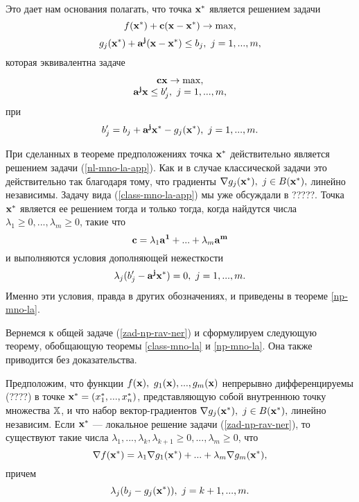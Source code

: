     Это дает нам основания полагать, что точка $\mathbf{x^{*}}$
    является решением задачи
    \[f(\mathbf{x^{*}})+\mathbf{c}(\mathbf{x}-\mathbf{x^{*}})\rightarrow\max,\]
    \[g_{j}(\mathbf{x^{*}})+\mathbf{a^{j}}(\mathbf{x}-\mathbf{x^{*}})\leq b_{j}, \ j=1,...,m,\]
    которая эквивалентна задаче
\begin{equation}
    \label{nl-mno-la-app}
    \begin{array}{c}
        \mathbf{c}\mathbf{x}\rightarrow\max, \\
        \mathbf{a^{j}}\mathbf{x}\leq b_{j}', \ j=1,...,m,
      \end{array}
\end{equation}
        при
    \[b_{j}'=b_{j}+\mathbf{a^{j}}\mathbf{x^{*}}-g_{j}(\mathbf{x^{*}}), \ j=1,...,m.\]

    При сделанных в теореме предположениях точка $\mathbf{x^{*}}$
    действительно является решением задачи (\ref{nl-mno-la-app}).
    Как и в случае классической задачи это действительно так благодаря тому, что градиенты
    $\nabla g_{j}(\mathbf{x^{*}}), \ j\in B(\mathbf{x^{*}}),$
    линейно независимы. Задачу вида (\ref{class-mno-la-app}) мы
    уже обсуждали в ?????. Точка $\mathbf{x^{*}}$ является ее решением  тогда и только
    тогда, когда найдутся числа $\lambda_{1}\geq0,...,\lambda_{m}\geq0$, такие
    что
    \[\mathbf{c}=\lambda_{1}\mathbf{a^{1}}+...+\lambda_{m}\mathbf{a^{m}}\]
    и выполняются условия дополняющей нежесткости
    \[\lambda_{j}(b_{j}'-\vc{a^{j}}\vc{x^{*}})=0, \ j=1,...,m.\]
    Именно эти условия, правда в других обозначениях, и приведены
    в теореме \ref{np-mno-la}.


    Вернемся к общей задаче (\ref{zad-np-rav-ner}) и сформулируем
    следующую теорему, обобщающую теоремы \ref{class-mno-la} и
    \ref{np-mno-la}. Она также приводится без доказательства.

    \begin{teo}
    \label{np-mno-la-rav-ner}
   Предположим, что функции $f(\mathbf{x}), \
    g_{1}(\mathbf{x}),...,g_{m}(\mathbf{x})$  непрерывно дифференцируемы (????) в
    точке $\mathbf{x^{*}}=(x^{*}_{1},...,x^{*}_{n})$, представляющую собой
    внутреннюю точку множества $\mathbb{X}$, и что набор
    вектор-градиентов
    $\nabla g_{j}(\mathbf{x^{*}}), \ j\in B(\mathbf{x^{*}}),$
    линейно независим. Если $\mathbf{x^{*}}$ --- локальное решение
    задачи (\ref{zad-np-rav-ner}), то существуют такие  числа
    $\lambda_{1},...,\lambda_{k}, \lambda_{k+1}\geq0,...,\lambda_{m}\geq0$,
    что
\begin{equation}
    \label{razloj-grad-np}
    \nabla f(\mathbf{x^{*}})=\lambda_{1}\nabla g_{1}(\mathbf{x^{*}})+...
    +\lambda_{m}\nabla g_{m}(\mathbf{x^{*}}),
\end{equation}
    причем
\begin{equation}
    \label{dop-nez-np-1}
    \lambda_{j}(b_{j}-g_{j}(\mathbf{x^{*}})), \ j=k+1,...,m.
\end{equation}
\end{teo}


